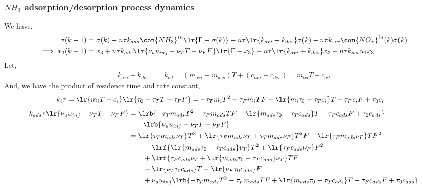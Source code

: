 \subsubsection{$NH_3$ adsorption/desorption process dynamics}
We have,
\begin{align*}
        \sigma(k + 1) &= \sigma(k)
        + n\tau k_{ads} \con{NH_3}^{in} \lr{\Gamma - \sigma(k)}
        - n \tau \lr{k_{oxi} + k_{des}} \sigma(k)
        - n \tau k_{scr} \con{NO_x}^{in}(k) \sigma(k) \\
        \implies x_3(k+1) &= x_3
                + n\tau k_{ads} \lr{\nu_u u_{inj} - \nu_T T - \nu_F F} \lr{\Gamma - x_3}
                - n \tau \lr{k_{oxi} + k_{des}} x_3
                - n \tau k_{scr} u_1 x_3
\end{align*}
Let,
\begin{align*}
        k_{oxi} + k_{des} &= k_{od} = (m_{oxi} + m_{des}) T + (c_{oxi} + c_{des}) = m_{od} T + c_{od}
\end{align*}
And, we have the product of residence time and rate constant,
\begin{align*}
        k_i \tau  = \lr{m_i T + c_i} \lr{\tau_0 - \tau_T T - \tau_F F}
                  &= - \tau_T m_i T^2 - \tau_F m_i TF + \lr{m_i \tau_0 - \tau_T c_i} T - \tau_F c_i F + \tau_0 c_i
\end{align*}
\begin{align*}
        k_{ads} \tau \lr{\nu_u u_{inj} - \nu_T T - \nu_F F} &= \lrb{- \tau_T m_{ads} T^2 - \tau_F m_{ads} TF + \lr{m_{ads} \tau_0 - \tau_T c_{ads}} T - \tau_F c_{ads} F + \tau_0 c_{ads}} \\
                                & \qquad \lrb{\nu_u u_{inj} - \nu_T T - \nu_F F}\\
        &= \lr{\tau_T m_{ads} \nu_T} T^3  + \lr{\tau_F m_{ads} \nu_T + \tau_T m_{ads} \nu_F} T^2 F
                + \lr{ \tau_F m_{ads} \nu_F } TF^2 \\
                & \qquad  - \lrf{\lr{ m_{ads} \tau_0 - \tau_T c_{ads}} v_T} T^2 + \lr{\tau_F c_{ads} \nu_F} F^2 \\
                & \qquad  + \lrf{ \tau_F c_{ads} \nu_T + \lr{ m_{ads} \tau_0 - \tau_T c_{ads} } \nu_T } TF \\
                & \qquad  - \lr{\nu_T \tau_0 c_{ads}} T - \lr{\nu_F \tau_0 c_{ads}} F\\
                & \qquad + \nu_u u_{inj} \lrb{- \tau_T m_{ads} T^2 - \tau_F m_{ads} TF + \lr{m_{ads} \tau_0 - \tau_T c_{ads}} T - \tau_F c_{ads} F + \tau_0 c_{ads}}
\end{align*}

